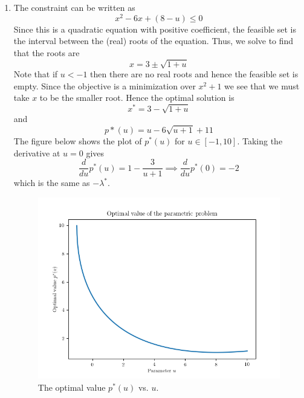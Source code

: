 \documentclass[11pt]{amsart}
\begin{document}
\begin{enumerate}
\begin{enumerate}
\item The constraint can be written as
\[
x^2 - 6x + (8-u) \le 0
\]
Since this is a quadratic equation with positive coefficient, the feasible set is the interval between the (real) roots of the equation.  Thus, we solve to find that the roots are
\[
x = 3 \pm \sqrt{1 + u}
\]
Note that if $u < -1$ then there are no real roots and hence the feasible set is empty.  Since the objective is a minimization over $x^2 + 1$ we see that we must take $x$ to be the smaller root.  Hence the optimal solution is
\[
x^* = 3 - \sqrt{1 + u}
\]
and
\[
p*(u) = u - 6\sqrt{u + 1} + 11
\]
The figure below shows the plot of $p^*(u)$ for $u \in [-1, 10]$.  Taking the derivative at $u = 0$ gives
\[
\frac{d}{du}p^*(u) = 1 - \frac{3}{u + 1} \implies \frac{d}{du}p^*(0) = -2
\]
which is the same as $-\lambda^*$.
\begin{figure}[H]
\centering
\includegraphics[width=5in]{fig3.png}
\caption{The optimal value $p^*(u)$ vs. $u$.}
\end{figure}

\end{enumerate}


\vspace{0.5in}




\end{enumerate}
\end{document}

